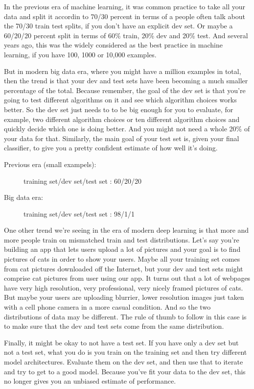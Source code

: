 \documentclass[UTF8]{article}
\begin{document}
In the previous era of machine learning, it was common practice to take all your data and split it
accordin to 70/30 percent in terms of a people often talk about the 70/30 train test splits, if you
don't have an explicit dev set. Or maybe a 60/20/20 percent split in terms of 60\% train, 20\% dev
and 20\% test. And several years ago, this was the widely considered as the best practice in
machine learning, if you have 100, 1000 or 10,000 examples.

But in modern big data era, where you might have a million examples in total, then the trend is
that your dev and test sets have been becoming a much smaller percentage of the total. Because
remember, the goal of the dev set is that you're going to test different algorithms on it and see
which algorithm choices works better. So the dev set just needs to to be big enough for you to
evaluate, for example, two different algorithm choices or ten different algorithm choices and
quickly decide which one is doing better. And you might not need a whole 20\% of your data for that.
Similarly, the main goal of your test set is, given your final classifier, to give you a pretty
confident estimate of how well it's doing.

\begin{description}
    \item[Previous era (small exampels): ] training set/dev set/test set : 60/20/20
    \item[Big data era: ] training set/dev set/test set : 98/1/1
\end{description}

One other trend we're seeing in the era of modern deep learning is that more and more people train
on mismatched train and test distributions. Let's say you're building an app that lets users upload
a lot of pictures and your goal is to find pictures of cats in order to show your users. Maybe all
your training set comes from cat pictures downloaded off the Internet, but your dev and test sets
might comprise cat pictures from user using our app. It turns out that a lot of webpages have very
high resolution, very professional, very nicely framed pictures of cats. But maybe your users are
uploading blurrier, lower resolution images just taken with a cell phone camera in a more casual
condition. And so the two distributions of data may be different. The rule of thumb to follow in
this case is to make sure that the dev and test sets come from the same distribution.

Finally, it might be okay to not have a test set. If you have only a dev set but not a test set,
what you do is you train on the training set and then try different model architectures. Evaluate
them on the dev set, and then use that to iterate and try to get to a good model. Because you've
fit your data to the dev set, this no longer gives you an unbiased estimate of performance.
\end{document}
